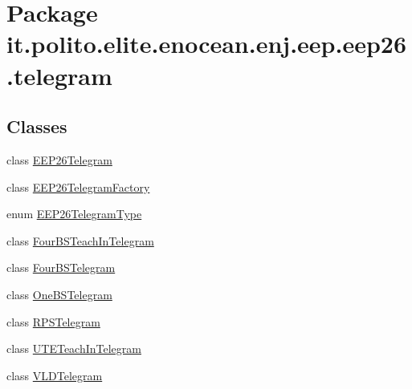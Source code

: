 \hypertarget{namespaceit_1_1polito_1_1elite_1_1enocean_1_1enj_1_1eep_1_1eep26_1_1telegram}{}\section{Package it.\+polito.\+elite.\+enocean.\+enj.\+eep.\+eep26.\+telegram}
\label{namespaceit_1_1polito_1_1elite_1_1enocean_1_1enj_1_1eep_1_1eep26_1_1telegram}
\subsection*{Classes}
\begin{DoxyCompactItemize}
\item 
class \hyperlink{classit_1_1polito_1_1elite_1_1enocean_1_1enj_1_1eep_1_1eep26_1_1telegram_1_1_e_e_p26_telegram}{E\+E\+P26\+Telegram}
\item 
class \hyperlink{classit_1_1polito_1_1elite_1_1enocean_1_1enj_1_1eep_1_1eep26_1_1telegram_1_1_e_e_p26_telegram_factory}{E\+E\+P26\+Telegram\+Factory}
\item 
enum \hyperlink{enumit_1_1polito_1_1elite_1_1enocean_1_1enj_1_1eep_1_1eep26_1_1telegram_1_1_e_e_p26_telegram_type}{E\+E\+P26\+Telegram\+Type}
\item 
class \hyperlink{classit_1_1polito_1_1elite_1_1enocean_1_1enj_1_1eep_1_1eep26_1_1telegram_1_1_four_b_s_teach_in_telegram}{Four\+B\+S\+Teach\+In\+Telegram}
\item 
class \hyperlink{classit_1_1polito_1_1elite_1_1enocean_1_1enj_1_1eep_1_1eep26_1_1telegram_1_1_four_b_s_telegram}{Four\+B\+S\+Telegram}
\item 
class \hyperlink{classit_1_1polito_1_1elite_1_1enocean_1_1enj_1_1eep_1_1eep26_1_1telegram_1_1_one_b_s_telegram}{One\+B\+S\+Telegram}
\item 
class \hyperlink{classit_1_1polito_1_1elite_1_1enocean_1_1enj_1_1eep_1_1eep26_1_1telegram_1_1_r_p_s_telegram}{R\+P\+S\+Telegram}
\item 
class \hyperlink{classit_1_1polito_1_1elite_1_1enocean_1_1enj_1_1eep_1_1eep26_1_1telegram_1_1_u_t_e_teach_in_telegram}{U\+T\+E\+Teach\+In\+Telegram}
\item 
class \hyperlink{classit_1_1polito_1_1elite_1_1enocean_1_1enj_1_1eep_1_1eep26_1_1telegram_1_1_v_l_d_telegram}{V\+L\+D\+Telegram}
\end{DoxyCompactItemize}
